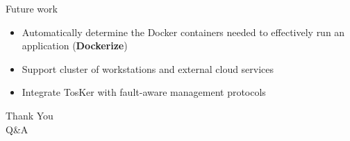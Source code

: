 \documentclass{beamer}
\begin{document}
  \begin{frame}{Future work}
    \begin{itemize}
      \item Automatically determine the Docker containers needed to effectively run an application (\textbf{Dockerize})
      \item Support cluster of workstations and external cloud services
      \item Integrate TosKer with fault-aware management protocols
    \end{itemize}
  \end{frame}

  \begin{frame}
    \centering
    \Huge Thank You \\
    \bigskip
    \LARGE Q\&A
  \end{frame}
\end{document}
